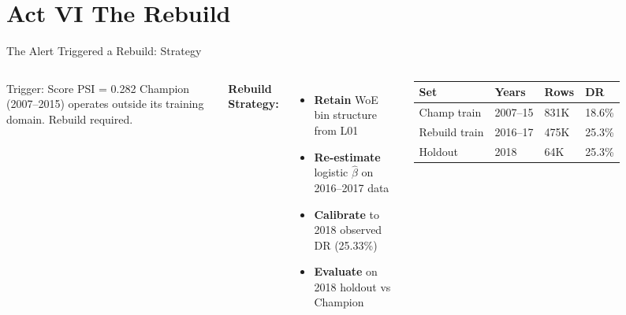 \documentclass[aspectratio=169,11pt]{beamer}
\newcommand{\B}[1]{\textbf{#1}}
\begin{document}
\section{Act VI \textemdash{} The Rebuild}

\begin{frame}[shrink=8]{The Alert Triggered a Rebuild: Strategy}
  \begin{columns}[T]
      \begin{alertblock}{Trigger: Score PSI = 0.282}\footnotesize
        Champion (2007--2015) operates outside its training domain. Rebuild required.
      \end{alertblock}
      \vspace{3pt}
      \footnotesize\textbf{Rebuild Strategy:}
      \begin{itemize}\footnotesize
        \item \B{Retain} WoE bin structure from L01
        \item \B{Re-estimate} logistic $\hat\beta$ on 2016--2017 data
        \item \B{Calibrate} to 2018 observed DR (25.33\%)
        \item \B{Evaluate} on 2018 holdout vs Champion
      \end{itemize}
      \vspace{3pt}
      \footnotesize\begin{tabular}{llll}
        \toprule
        \textbf{Set} & \textbf{Years} & \textbf{Rows} & \textbf{DR} \\
        \midrule
        Champ train   & 2007--15 & 831K & 18.6\% \\
        Rebuild train & 2016--17 & 475K & 25.3\% \\
        Holdout       & 2018     & 64K  & 25.3\% \\
        \bottomrule
      \end{tabular}


\end{columns}
\end{frame}
\end{document}
